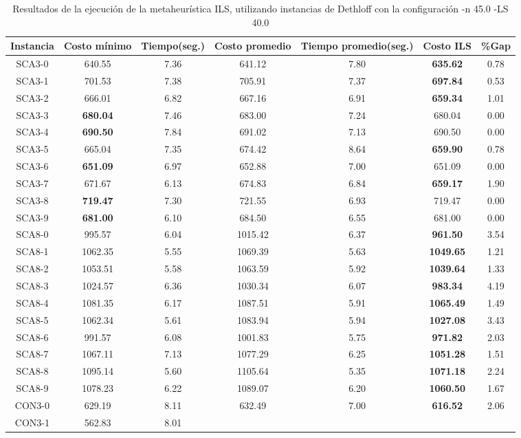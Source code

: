 \begin{table}[ht]
\caption{Resultados de la ejecución de la metaheurística ILS, utilizando instancias de Dethloff con la configuración -n 45.0 -LS 40.0}
\centering
\small
\begin{tabular}{c c c c c c c}
\hline\hline
Instancia & Costo mínimo & Tiempo(seg.) & Costo promedio & Tiempo promedio(seg.) & Costo ILS & \%Gap \\ [0.5ex]
\hline
SCA3-0 & 640.55 & 7.36 & 
641.12 & 7.80 & \bf{635.62} & 
0.78\\SCA3-1 & 701.53 & 7.38 & 
705.91 & 7.37 & \bf{697.84} & 
0.53\\SCA3-2 & 666.01 & 6.82 & 
667.16 & 6.91 & \bf{659.34} & 
1.01\\SCA3-3 & \bf{680.04} & 7.46 & 
683.00 & 7.24 & 680.04 & 0.00\\
SCA3-4 & \bf{690.50} & 7.84 & 
691.02 & 7.13 & 690.50 & 0.00\\
SCA3-5 & 665.04 & 7.35 & 
674.42 & 8.64 & \bf{659.90} & 
0.78\\SCA3-6 & \bf{651.09} & 6.97 & 
652.88 & 7.00 & 651.09 & 0.00\\
SCA3-7 & 671.67 & 6.13 & 
674.83 & 6.84 & \bf{659.17} & 
1.90\\SCA3-8 & \bf{719.47} & 7.30 & 
721.55 & 6.93 & 719.47 & 0.00\\
SCA3-9 & \bf{681.00} & 6.10 & 
684.50 & 6.55 & 681.00 & 0.00\\
SCA8-0 & 995.57 & 6.04 & 
1015.42 & 6.37 & \bf{961.50} & 
3.54\\SCA8-1 & 1062.35 & 5.55 & 
1069.39 & 5.63 & \bf{1049.65} & 
1.21\\SCA8-2 & 1053.51 & 5.58 & 
1063.59 & 5.92 & \bf{1039.64} & 
1.33\\SCA8-3 & 1024.57 & 6.36 & 
1030.34 & 6.07 & \bf{983.34} & 
4.19\\SCA8-4 & 1081.35 & 6.17 & 
1087.51 & 5.91 & \bf{1065.49} & 
1.49\\SCA8-5 & 1062.34 & 5.61 & 
1083.94 & 5.94 & \bf{1027.08} & 
3.43\\SCA8-6 & 991.57 & 6.08 & 
1001.83 & 5.75 & \bf{971.82} & 
2.03\\SCA8-7 & 1067.11 & 7.13 & 
1077.29 & 6.25 & \bf{1051.28} & 
1.51\\SCA8-8 & 1095.14 & 5.60 & 
1105.64 & 5.35 & \bf{1071.18} & 
2.24\\SCA8-9 & 1078.23 & 6.22 & 
1089.07 & 6.20 & \bf{1060.50} & 
1.67\\CON3-0 & 629.19 & 8.11 & 
632.49 & 7.00 & \bf{616.52} & 
2.06\\CON3-1 & 562.83 & 8.01 & 

\end{tabular}
\end{table}
